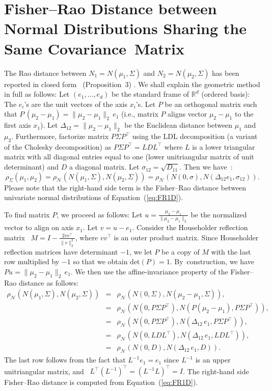 \documentclass[entropy,article,accept,oneauthor,pdftex,entropy]{Definitions/mdpi}
\def\det{\mathrm{det}}
\def\bbR{\mathbb{R}}
\def\calN{\mathcal{N}}
\def\bbR{\mathbb{R}}
\begin{document}
\section{Fisher–Rao Distance between Normal Distributions Sharing the Same Covariance~Matrix}\label{sec:BFRsamecovar}

The Rao distance between $N_1=N(\mu_1,\Sigma)$ and $N_2=N(\mu_2,\Sigma)$ has been reported in closed form~\cite{FRMVNReview-2020} {(Proposition~3)}%
. We shall explain the geometric method in full as follows:
Let $(e_1,\ldots,e_d)$ be the standard frame of $\bbR^d$ (ordered basis): The $e_i$'s are the unit vectors of the axis $x_i$'s. 
Let $P$ be an orthogonal matrix such that $P\, (\mu_2-\mu_1)=\|\mu_2-\mu_1\|_2\, e_1$ 
(i.e., matrix $P$ aligns vector $\mu_2-\mu_1$ to the first axis $x_1$). Let $\Delta_{12}=\|\mu_2-\mu_1\|_2$ be the Euclidean distance between $\mu_1$ and $\mu_2$.
Furthermore, factorize matrix $P\Sigma P^\top$ using the LDL decomposition (a variant of the Cholesky decomposition) as 
$P\Sigma P^\top = LDL^\top$ where $L$ is a lower triangular matrix with all diagonal entries equal to one (lower unitriangular matrix of unit determinant) and $D$ a diagonal matrix. 
Let $\sigma_{12}=\sqrt{D_{11}}$.
Then we have~\cite{FRMVNReview-2020}:
\begin{equation}\label{eq:FRSigma}
\rho_\Sigma(\mu_1,\mu_2)= \rho_\calN(N(\mu_1,\Sigma),N(\mu_2,\Sigma)) = \rho_\calN(N(0,\sigma),N(\Delta_{12}e_1,\sigma_{12})).
\end{equation}
Please note that the right-hand side term is the Fisher–Rao distance between univariate normal distributions of Equation~(\ref{eq:FR1D}).

To find matrix $P$, we proceed as follows: Let $u=\frac{\mu_2-\mu_1}{\|\mu_2-\mu_1\|_2}$ be the normalized vector to align on axis $x_1$.
Let $v=u-e_1$. Consider the  Householder reflection matrix~\cite{householder1958unitary} $M=I-\frac{2vv^\top}{\|v\|_2^2}$, where $vv^\top$ is an outer product matrix.
Since Householder reflection matrices have determinant $-1$, we let $P$ be a copy of $M$ with the last row multiplied by $-1$ 
so that we obtain $\det(P)=1$. By~construction, we have $Pu=\|\mu_2-\mu_1\|_2\, e_1$.
We then use the affine-invariance property of the Fisher–Rao distance as follows:
\begin{eqnarray*}
\rho_\calN(N(\mu_1,\Sigma),N(\mu_2,\Sigma)) &=& \rho_\calN(N(0,\Sigma),N(\mu_2-\mu_1,\Sigma)),\\
&=& \rho_\calN(N(0,P\Sigma P^\top),N(P(\mu_2-\mu_1),P\Sigma P^\top)),\\
&=& \rho_\calN(N(0,P\Sigma P^\top),N(\Delta_{12}\, e_1,P\Sigma P^\top)),\\
&=& \rho_\calN(N(0,L D L^\top),N(\Delta_{12}\, e_1,L D L^\top)),\\
&=& \rho_\calN(N(0,D),N(\Delta_{12}\, e_1, D)).
\end{eqnarray*}
The last row follows from the fact that $L^{-1}e_1=e_1$ since $L^{-1}$ is an upper unitriangular matrix, and~
$L^\top (L^{-1})^\top=(L^{-1}L)^\top=I$.
The right-hand side Fisher–Rao distance is computed from Equation~(\ref{eq:FR1D}).
\end{document}
